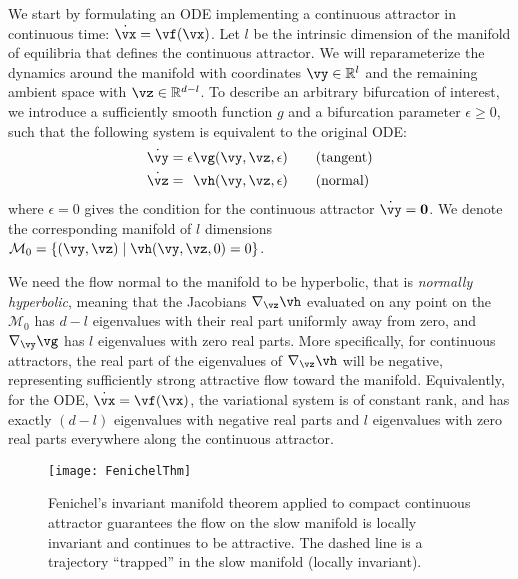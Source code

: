 \documentclass{article} %
\newcounter{ct}
\newcommand{\reals}{\mathbb{R}}
\newcommand{\manifold}{\mathcal{M}}
\theoremstyle{definition}
\theoremstyle{remark}
\begin{document}
We start by formulating an ODE implementing a continuous attractor in continuous time: $\dot{\vx} = \vf(\vx)$.
Let $l$ be the intrinsic dimension of the manifold of equilibria that defines the continuous attractor.
We will reparameterize the dynamics around the manifold with coordinates $\vy \in \reals^l$ and the remaining ambient space with $\vz \in \reals^{d-l}$.
To describe an arbitrary bifurcation of interest, we introduce a sufficiently smooth function $g$ and a bifurcation parameter $\epsilon \geq 0$, such that the following system is equivalent to the original ODE:
\begin{align}\label{eq:fenichel:flow}
    \dot{\vy} &=           \epsilon  \vg(\vy, \vz, \epsilon) \qquad \text{(tangent)}\\
    \dot{\vz} &= \hphantom{\epsilon} \vh(\vy, \vz, \epsilon) \qquad \text{(normal)}
\end{align}
where $\epsilon = 0$ gives the condition for the continuous attractor $\dot{\vy} = \mathbf{0}$.
We denote the corresponding manifold of $l$ dimensions $\manifold_0 = \{(\vy,\vz) \mid \vh(\vy,\vz,0) = 0\}$.

We need the flow normal to the manifold to be hyperbolic, that is \emph{normally hyperbolic}, meaning that the Jacobians $\nabla_\vz \vh$ evaluated on any point on the $\manifold_0$ has $d-l$ eigenvalues with their real part uniformly away from zero, and $\nabla_\vy \vg$ has $l$ eigenvalues with zero real parts.
More specifically, for continuous attractors, the real part of the eigenvalues of $\nabla_\vz \vh$ will be negative, representing sufficiently strong attractive flow toward the manifold.
Equivalently, for the ODE, $\dot{\vx} = \vf(\vx)$, the variational system is of constant rank, and has exactly $(d-l)$ eigenvalues with negative real parts and $l$ eigenvalues with zero real parts everywhere along the continuous attractor.

\begin{figure}[bthp]
  \centering
  \texttt{[image: FenichelThm]}
  \caption{
    Fenichel's invariant manifold theorem applied to compact continuous attractor guarantees the flow on the slow manifold is locally invariant and continues to be attractive.
    The dashed line is a trajectory ``trapped'' in the slow manifold (locally invariant). %
  }
  \label{fig:fenichel}
\end{figure}
\end{document}
